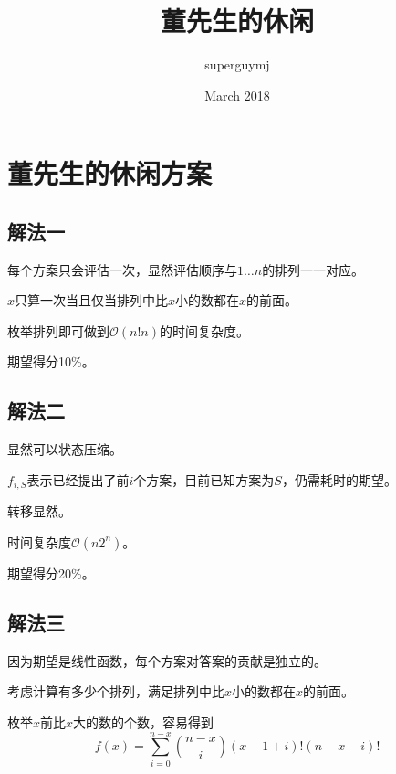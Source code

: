 \documentclass{article}
\title{董先生的休闲}
\author{superguymj}
\date{March 2018}
\begin{document}
\section*{董先生的休闲方案}

\subsection*{解法一}

每个方案只会评估一次，显然评估顺序与$1 \dots n$的排列一一对应。

$x$只算一次当且仅当排列中比$x$小的数都在$x$的前面。

枚举排列即可做到$\mathcal{O}(n!n)$的时间复杂度。

期望得分10\%。

\subsection*{解法二}

显然可以状态压缩。

$f_{i,S}$表示已经提出了前$i$个方案，目前已知方案为$S$，仍需耗时的期望。

转移显然。

时间复杂度$\mathcal{O}(n2^n)$。

期望得分20\%。



\subsection*{解法三}

因为期望是线性函数，每个方案对答案的贡献是独立的。

考虑计算有多少个排列，满足排列中比$x$小的数都在$x$的前面。

枚举$x$前比$x$大的数的个数，容易得到
\[
f(x) = \sum_{i=0}^{n-x} \binom{n-x}{i} (x-1+i)! (n-x-i)!
\]
\end{document}
